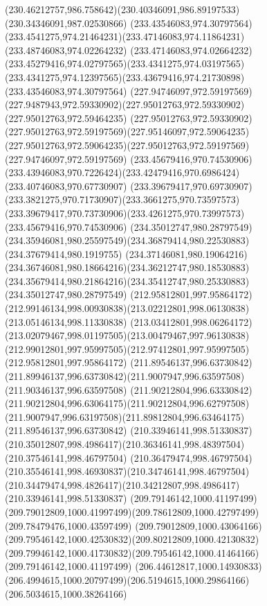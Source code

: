 {{\curveto(230.46212757,986.758642)(230.40346091,986.89197533)(230.34346091,987.02530866)
\moveto(233.43546083,974.30797564)
\curveto(233.4541275,974.21464231)(233.47146083,974.11864231)(233.48746083,974.02264232)
\curveto(233.47146083,974.02664232)(233.45279416,974.02797565)(233.4341275,974.03197565)
\curveto(233.4341275,974.12397565)(233.43679416,974.21730898)(233.43546083,974.30797564)
\moveto(227.94746097,972.59197569)
\curveto(227.9487943,972.59330902)(227.95012763,972.59330902)(227.95012763,972.59464235)
\curveto(227.95012763,972.59330902)(227.95012763,972.59197569)(227.95146097,972.59064235)
\curveto(227.95012763,972.59064235)(227.95012763,972.59197569)(227.94746097,972.59197569)
\moveto(233.45679416,970.74530906)
\curveto(233.43946083,970.7226424)(233.42479416,970.6986424)(233.40746083,970.67730907)
\curveto(233.39679417,970.69730907)(233.3821275,970.71730907)(233.3661275,970.73597573)
\curveto(233.39679417,970.73730906)(233.4261275,970.73997573)(233.45679416,970.74530906)
\moveto(234.35012747,980.28797549)
\curveto(234.35946081,980.25597549)(234.36879414,980.22530883)(234.37679414,980.1919755)
\curveto(234.37146081,980.19064216)(234.36746081,980.18664216)(234.36212747,980.18530883)
\curveto(234.35679414,980.21864216)(234.35412747,980.25330883)(234.35012747,980.28797549)
\moveto(212.95812801,997.95864172)
\curveto(212.99146134,998.00930838)(213.02212801,998.06130838)(213.05146134,998.11330838)
\curveto(213.03412801,998.06264172)(213.02079467,998.01197505)(213.00479467,997.96130838)
\curveto(212.99012801,997.95997505)(212.97412801,997.95997505)(212.95812801,997.95864172)
\moveto(211.89546137,996.63730842)
\curveto(211.89946137,996.63730842)(211.9007947,996.63597508)(211.90346137,996.63597508)
\curveto(211.90212804,996.63330842)(211.90212804,996.63064175)(211.90212804,996.62797508)
\curveto(211.9007947,996.63197508)(211.89812804,996.63464175)(211.89546137,996.63730842)
\moveto(210.33946141,998.51330837)
\curveto(210.35012807,998.4986417)(210.36346141,998.48397504)(210.37546141,998.46797504)
\curveto(210.36479474,998.46797504)(210.35546141,998.46930837)(210.34746141,998.46797504)
\curveto(210.34479474,998.4826417)(210.34212807,998.4986417)(210.33946141,998.51330837)
\moveto(209.79146142,1000.41197499)
\curveto(209.79012809,1000.41997499)(209.78612809,1000.42797499)(209.78479476,1000.43597499)
\curveto(209.79012809,1000.43064166)(209.79546142,1000.42530832)(209.80212809,1000.42130832)
\curveto(209.79946142,1000.41730832)(209.79546142,1000.41464166)(209.79146142,1000.41197499)
\moveto(206.44612817,1000.14930833)
\curveto(206.4994615,1000.20797499)(206.5194615,1000.29864166)(206.5034615,1000.38264166)
}}
